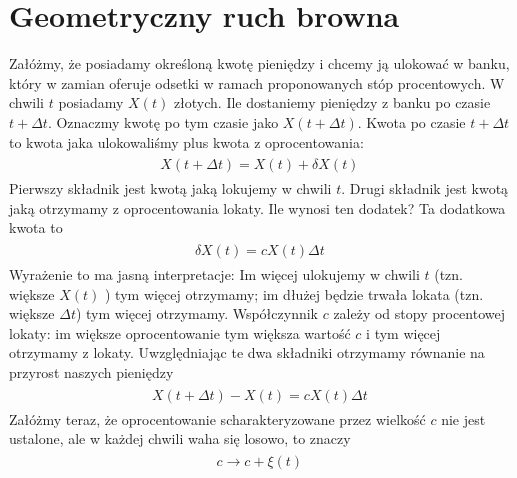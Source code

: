 \documentclass[a4paper,12pt,polish]{sphinxmanual}
\begin{document}
\section{Geometryczny ruch browna}
\label{ch3/chIII033:geometryczny-ruch-browna}\label{ch3/chIII033::doc}
Załóżmy, że posiadamy określoną kwotę pieniędzy i chcemy ją ulokować w banku, który w zamian oferuje odsetki w ramach proponowanych stóp procentowych. W chwili $t$ posiadamy $X(t)$ złotych. Ile dostaniemy pieniędzy z banku po czasie $t+ \Delta t$. Oznaczmy kwotę po tym czasie jako $X(t+\Delta t)$. Kwota po czasie $t+\Delta t$ to kwota jaka ulokowaliśmy plus kwota z oprocentowania:
\label{ch3/chIII033:equation-eqn1}\begin{gather}
\begin{split}X(t+\Delta t) = X(t) + \delta X(t)\,\end{split}\label{ch3/chIII033-eqn1}
\end{gather}
Pierwszy składnik jest kwotą jaką lokujemy w chwili $t$. Drugi składnik jest kwotą jaką otrzymamy z oprocentowania lokaty. Ile wynosi ten dodatek? Ta dodatkowa kwota to
\label{ch3/chIII033:equation-eqn2}\begin{gather}
\begin{split} \delta X(t) = c X(t) \Delta t\,\end{split}\label{ch3/chIII033-eqn2}
\end{gather}
Wyrażenie to ma jasną interpretacje: Im więcej ulokujemy w chwili $t$ (tzn. większe $X(t)$ ) tym więcej otrzymamy; im dłużej będzie trwała lokata (tzn. większe $\Delta t$) tym więcej otrzymamy. Współczynnik $c$ zależy od stopy procentowej lokaty: im większe oprocentowanie tym większa wartość $c$ i tym więcej otrzymamy z lokaty. Uwzględniając te dwa składniki otrzymamy równanie na przyrost naszych pieniędzy
\label{ch3/chIII033:equation-eqn3}\begin{gather}
\begin{split}X(t+\Delta t) - X(t) = c X(t) \Delta t\,\end{split}\label{ch3/chIII033-eqn3}
\end{gather}
Załóżmy teraz, że oprocentowanie scharakteryzowane przez wielkość $c$ nie jest ustalone, ale w każdej chwili waha się losowo, to znaczy
\label{ch3/chIII033:equation-eqn4}\begin{gather}
\begin{split}c \to c + \xi(t)\,\end{split}\label{ch3/chIII033-eqn4}
\end{gather}
\end{document}
